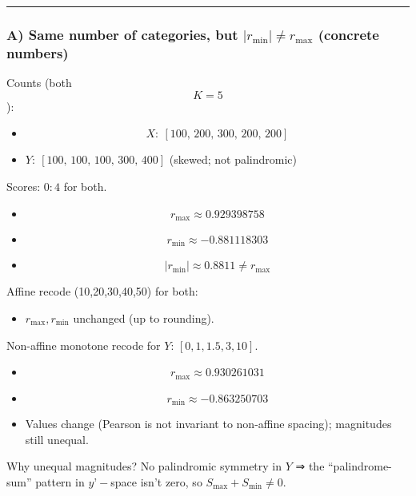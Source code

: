 \documentclass[
  12pt,
]{article}
\providecommand{\tightlist}{%
  \setlength{\itemsep}{0pt}\setlength{\parskip}{0pt}}
\theoremstyle{plain}
\theoremstyle{definition}
\theoremstyle{remark}
\begin{document}
\begin{center}\rule{0.5\linewidth}{0.5pt}\end{center}

\subsubsection{\texorpdfstring{A) Same number of categories, but
\(|r_{\min}|\ne r_{\max}\) (concrete
numbers)}{A) Same number of categories, but \textbar r\_\{\textbackslash min\}\textbar\textbackslash ne r\_\{\textbackslash max\} (concrete numbers)}}\label{a-same-number-of-categories-but-r_minne-r_max-concrete-numbers}

Counts (both \[K=5\]):

\begin{itemize}
\item
  \[X:\ [100,\,200,\,300,\,200,\,200]\]
\item
  \(Y:\ [100,\,100,\,100,\,300,\,400]\) (skewed; not palindromic)
\end{itemize}

Scores: \(0{:}4\) for both.

\begin{itemize}
\item
  \[r_{\max}\approx 0.929398758\]
\item
  \[r_{\min}\approx -0.881118303\]
\item
  \[|r_{\min}| \approx 0.8811 \ne r_{\max}\]
\end{itemize}

Affine recode (10,20,30,40,50) for both:

\begin{itemize}
\tightlist
\item
  \(r_{\max}, r_{\min}\) unchanged (up to rounding).
\end{itemize}

Non-affine monotone recode for \(Y\): \([0,1,1.5,3,10]\).

\begin{itemize}
\item
  \[r_{\max}\approx 0.930261031\]
\item
  \[r_{\min}\approx -0.863250703\]
\item
  Values change (Pearson is not invariant to non-affine spacing);
  magnitudes still unequal.
\end{itemize}

Why unequal magnitudes? No palindromic symmetry in \(Y\) ⇒ the
``palindrome-sum'' pattern in \(y’-\)space isn't zero, so
\(S_{\max}+S_{\min}\ne 0\).
\end{document}
